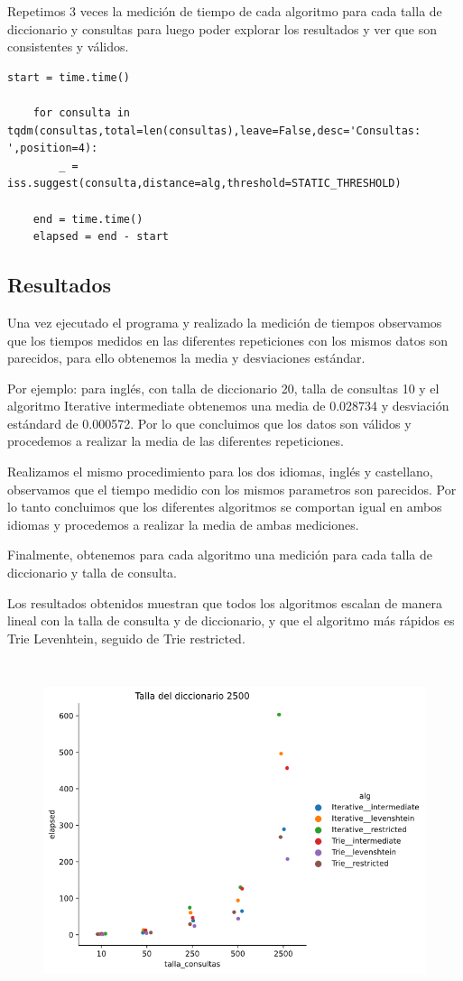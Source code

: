 Repetimos 3 veces la medición de tiempo de cada algoritmo para cada talla de diccionario y consultas para luego poder explorar los resultados y ver que son consistentes y válidos.
\begin{lstlisting}[caption=medición de tiempos]
    start = time.time()
                        
    for consulta in tqdm(consultas,total=len(consultas),leave=False,desc='Consultas: ',position=4):
        _ = iss.suggest(consulta,distance=alg,threshold=STATIC_THRESHOLD)

    end = time.time()
    elapsed = end - start
\end{lstlisting}

\subsection{Resultados}

Una vez ejecutado el programa y realizado la medición de tiempos observamos que los tiempos medidos en las diferentes repeticiones con los mismos datos son parecidos, para ello obtenemos la media y desviaciones estándar.

Por ejemplo: para inglés, con talla de diccionario 20, talla de consultas 10 y el algoritmo Iterative intermediate obtenemos una media de 0.028734 y desviación estándard de 0.000572. Por lo que concluimos que los datos son válidos y procedemos a realizar la media de las diferentes repeticiones.

Realizamos el mismo procedimiento para los dos idiomas, inglés y castellano, observamos que el tiempo medidio con los mismos parametros son parecidos. Por lo tanto concluimos que los diferentes algoritmos se comportan igual en ambos idiomas y procedemos a realizar la media de ambas mediciones.

Finalmente, obtenemos para cada algoritmo una medición para cada talla de diccionario y talla de consulta.

Los resultados obtenidos muestran que todos los algoritmos escalan de manera lineal con la talla de consulta y de diccionario, y que el algoritmo más rápidos es Trie Levenhtein, seguido de Trie restricted.

\begin{figure}[h]
\includegraphics[width=15cm, height=10cm]{images/grafico.png}
\centering
\end{figure}

\newpage 